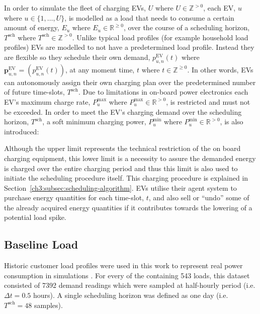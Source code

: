In order to simulate the fleet of charging EVs, $U$ where $U \in \mathbb{Z}^{>0}$, each EV, $u$ where $u \in \{1, \dots, U\}$, is modelled as a load that needs to consume a certain amount of energy, $E_u$ where $E_u \in \mathbb{R}^{\geq0}$, over the course of a scheduling horizon, $T^\text{sch}$ where $T^\text{sch} \in \mathbb{Z}^{>0}$.
Unlike typical load profiles (for example household load profiles) EVs are modelled to not have a predetermined load profile.
Instead they are flexible so they schedule their own demand, $p^\text{EV}_{u,n}(t)$ where $\textbf{p}^\text{EV}_{u,n} = (p^\text{EV}_{u,n}(t))$, at any moment time, $t$ where $t \in \mathbb{Z}^{\geq0}$.
In other words, EVs can autonomously assign their own charging plan over the predetermined number of future time-slots, $T^\text{sch}$.
Due to limitations in on-board power electronics each EV's maximum charge rate, $P^\text{max}_{u}$ where $P^\text{max}_{u} \in \mathbb{R}^{>0}$, is restricted and must not be exceeded.
In order to meet the EV's charging demand over the scheduling horizon, $T^\text{sch}$, a soft minimum charging power, $P^\text{min}_{u}$ where $P^\text{min}_{u} \in \mathbb{R}^{>0}$, is also introduced:



Although the upper limit represents the technical restriction of the on board charging equipment, this lower limit is a necessity to assure the demanded energy is charged over the entire charging period and thus this limit is also used to initiate the scheduling procedure itself.
This charging procedure is explained in Section~\ref{ch3:subsec:scheduling-algorithm}.
EVs utilise their agent system to purchase energy quantities for each time-slot, $t$, and also sell or ``undo'' some of the already acquired energy quantities if it contributes towards the lowering of a potential load spike.

\subsection{Baseline Load}


Historic customer load profiles were used in this work to represent real power consumption in simulations \cite{IrishData2002}.
For every of the containing 543 loads, this dataset consisted of 7392 demand readings which were sampled at half-hourly period (i.e. $\Delta t = 0.5$ hours).
A single scheduling horizon was defined as one day (i.e. $T^\text{sch}=48$ samples).

